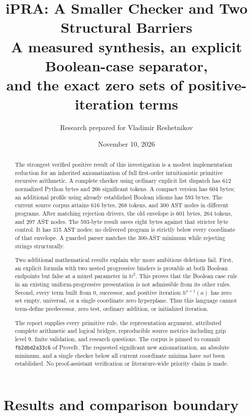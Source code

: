 \documentclass[11pt,letterpaper]{article}
\title{\color{ink}\textbf{iPRA: A Smaller Checker and Two Structural Barriers}\\[.6em]
\large A measured synthesis, an explicit Boolean-case separator,\\
and the exact zero sets of positive-iteration terms}
\author{Research prepared for Vladimir Reshetnikov}
\date{November 10, 2026}
\theoremstyle{definition}\newtheorem{definition}[theorem]{Definition}
\theoremstyle{remark}\newtheorem{remark}[theorem]{Remark}
\begin{document}
\maketitle
\begin{abstract}
The strongest verified positive result of this investigation is a modest
implementation reduction for an inherited axiomatization of full first-order
intuitionistic primitive recursive arithmetic. A complete checker using
ordinary explicit list dispatch has 612 normalized Python bytes and 266
significant tokens. A compact version has 604 bytes; an additional profile
using already established Boolean idioms has 593 bytes. The current source
corpus attains 616 bytes, 268 tokens, and 300 AST nodes in different programs.
After matching rejection drivers, the old envelope is 601 bytes, 264 tokens,
and 297 AST nodes. The 593-byte result saves eight bytes against that stricter
byte control. It has 315 AST nodes; no delivered program is strictly
below every coordinate of that envelope. A guarded parser matches the
300-AST minimum while rejecting strings structurally.

Two additional mathematical results explain why more ambitious deletions
fail. First, an explicit formula with two nested progressive binders is
provable at both Boolean endpoints but false at a mixed parameter in
$\mathbb N^2$. This proves that the Boolean case rule in an existing
uniform-progressive presentation is not admissible from its other rules.
Second, every term built from $0$, successor, and positive iteration
$h^{n+1}(a)$ has zero set empty, universal, or a single coordinate zero
hyperplane. Thus this language cannot term-define predecessor, zero test,
ordinary addition, or initialized iteration.

The report supplies every primitive rule, the representation argument,
attributed complete arithmetic and logical bridges, reproducible source
metrics including gzip level 9, finite validation, and research questions.
The corpus is pinned to commit \texttt{fb2dbd2a33c6} of ProveIt.
The requested significant new axiomatization, an absolute minimum, and a
single checker below all current coordinate minima have \emph{not} been
established. No proof-assistant verification or literature-wide priority
claim is made.
\end{abstract}
\clearpage
\setcounter{tocdepth}{1}\tableofcontents
\clearpage

\section{Results and comparison boundary}
\end{document}
